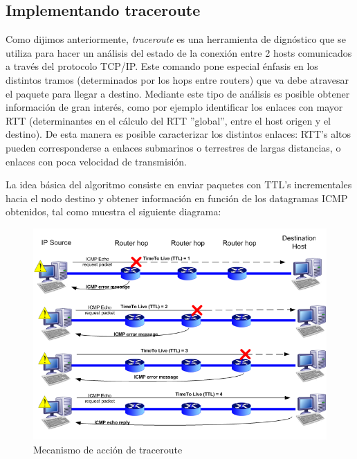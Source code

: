 \subsection{Implementando traceroute}

Como dijimos anteriormente, \emph{traceroute} es una herramienta de dign\'ostico que se utiliza para hacer
un an\'alisis del estado de la conexi\'on entre 2 hosts comunicados a trav\'es del protocolo TCP/IP.
Este comando pone especial \'enfasis en los distintos tramos (determinados por los hops entre routers)
que va debe atravesar el paquete para llegar a destino.
Mediante este tipo de an\'alisis es posible obtener informaci\'on de gran inter\'es, como por
ejemplo identificar los enlaces con mayor RTT (determinantes en el c\'alculo del
RTT ''global'', entre el host origen y el destino). De esta manera es posible caracterizar los distintos
enlaces: RTT's altos pueden corresponderse a enlaces submarinos o terrestres de largas distancias, o
enlaces con poca velocidad de transmisi\'on.

La idea b\'asica del algoritmo consiste en enviar paquetes con TTL's incrementales hacia el nodo destino
y obtener informaci\'on en funci\'on de los datagramas ICMP obtenidos, tal como muestra el siguiente
diagrama:

\begin{figure}[!h]
  \begin{center}
      \includegraphics[scale=0.4]{imagenes/traceroute.png}
      \caption{Mecanismo de acci\'on de traceroute}
      \label{fig:contra1}
  \end{center}
\end{figure}

